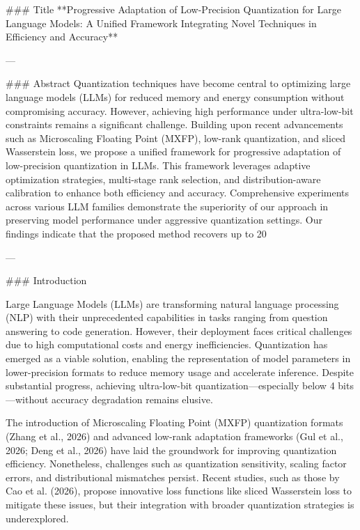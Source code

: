 ### Title  
**Progressive Adaptation of Low-Precision Quantization for Large Language Models: A Unified Framework Integrating Novel Techniques in Efficiency and Accuracy**

---

### Abstract  
Quantization techniques have become central to optimizing large language models (LLMs) for reduced memory and energy consumption without compromising accuracy. However, achieving high performance under ultra-low-bit constraints remains a significant challenge. Building upon recent advancements such as Microscaling Floating Point (MXFP), low-rank quantization, and sliced Wasserstein loss, we propose a unified framework for progressive adaptation of low-precision quantization in LLMs. This framework leverages adaptive optimization strategies, multi-stage rank selection, and distribution-aware calibration to enhance both efficiency and accuracy. Comprehensive experiments across various LLM families demonstrate the superiority of our approach in preserving model performance under aggressive quantization settings. Our findings indicate that the proposed method recovers up to 20%

---

### Introduction

Large Language Models (LLMs) are transforming natural language processing (NLP) with their unprecedented capabilities in tasks ranging from question answering to code generation. However, their deployment faces critical challenges due to high computational costs and energy inefficiencies. Quantization has emerged as a viable solution, enabling the representation of model parameters in lower-precision formats to reduce memory usage and accelerate inference. Despite substantial progress, achieving ultra-low-bit quantization—especially below 4 bits—without accuracy degradation remains elusive.

The introduction of Microscaling Floating Point (MXFP) quantization formats (Zhang et al., 2026) and advanced low-rank adaptation frameworks (Gul et al., 2026; Deng et al., 2026) have laid the groundwork for improving quantization efficiency. Nonetheless, challenges such as quantization sensitivity, scaling factor errors, and distributional mismatches persist. Recent studies, such as those by Cao et al. (2026), propose innovative loss functions like sliced Wasserstein loss to mitigate these issues, but their integration with broader quantization strategies is underexplored.

